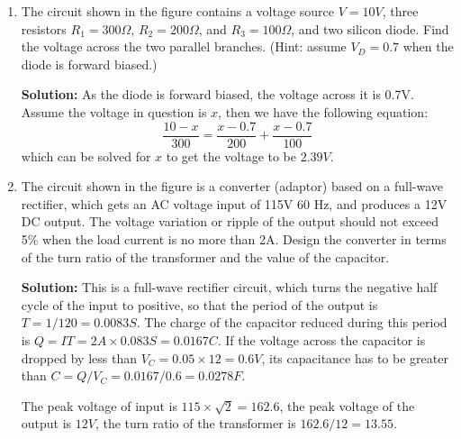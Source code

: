 \begin{enumerate}

 {\bf Solution:} 
 Method 1: As the diode is forward biased, the voltage across it
 is 0.7V, and the current through $R_2$ is $0.7V/200\Omega=3.5mA$, and
 the current through $R_1$ is $(10-0.7)/300=31 mA$. The current through
 the diode is therefore $I_D=31-3.5=27.5 mA$.

 Method 2: set up the equation for $V_D$ and $I_D$:
 \[ \frac{V_D}{R_2}+I_D=\frac{V-V_D}{R_1} \]
 if $V_D=0$, $I_D=\frac{V}{R_1}=\frac{10}{300}=33.3 mA$
 if $I_D=0$, $V_D=V\;\frac{R_2}{R_1+R_2}=10\frac{200}{300+200}=4V$
 the intersection of the two curves is aprroximately the same as method 1.


\item The circuit shown in the figure contains a voltage source $V=10V$,
three resistors $R_1=300\Omega$, $R_2=200\Omega$, and $R_3=100\Omega$, 
and two silicon diode. Find the voltage across the two parallel branches.
(Hint: assume $V_D=0.7$ when the diode is forward biased.)


 {\bf Solution:} As the diode is forward biased, the voltage across it
 is 0.7V. Assume the voltage in question is $x$, then we have the following
 equation:
 \[	\frac{10-x}{300}=\frac{x-0.7}{200}+\frac{x-0.7}{100}	\]
 which can be solved for $x$ to get the voltage to be $2.39V$.


\item The circuit shown in the figure is a converter (adaptor) based on
a full-wave rectifier, which gets an AC voltage input of 115V 60 Hz, and
produces a 12V DC output. The voltage variation or ripple of the output
should not exceed 5\% when the load current is no more than 2A. Design 
the converter in terms of the turn ratio of the transformer and the 
value of the capacitor. 


{\bf Solution:} This is a full-wave rectifier circuit, which turns the
negative half cycle of the input to positive, so that the period of the
output is $T=1/120=0.0083S$. The charge of the capacitor reduced during
this period is $Q=IT=2A\times 0.083 S=0.0167 C$. If the voltage across
the capacitor is dropped by less than $V_C=0.05\times 12=0.6V$, its 
capacitance has to be greater than $C=Q/V_C=0.0167/0.6=0.0278 F$.

The peak voltage of input is $115\times \sqrt{2}=162.6$, the peak voltage
of the output is $12V$, the turn ratio of the transformer is 
$162.6/12=13.55$. 

\end{enumerate}



